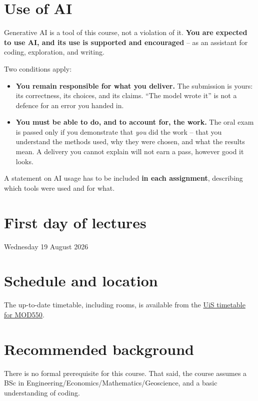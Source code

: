 \documentclass[letterpaper,12pt,oneside]{article}
\begin{document}
\section*{Use of AI}

Generative AI is a tool of this course, not a violation of it. \textbf{You are expected to use AI, and its use is supported and encouraged} -- as an assistant for coding, exploration, and writing.

Two conditions apply:

\begin{itemize}
\item \textbf{You remain responsible for what you deliver.} The submission is yours: its correctness, its choices, and its claims. ``The model wrote it'' is not a defence for an error you handed in.
\item \textbf{You must be able to do, and to account for, the work.} The oral exam is passed only if you demonstrate that \emph{you} did the work -- that you understand the methods used, why they were chosen, and what the results mean. A delivery you cannot explain will not earn a pass, however good it looks.
\end{itemize}

A statement on AI usage has to be included \textbf{in each assignment}, describing which tools were used and for what.

\section*{First day of lectures}

Wednesday 19 August 2026


\section*{Schedule and location}

The up-to-date timetable, including rooms, is available from the \href{https://tp.educloud.no/uis/timeplan/timeplan.php?id=MOD550&type=course&hide_old=1}{UiS timetable for MOD550}.


\section*{Recommended background}

There is no formal prerequisite for this course. That said, the course assumes a BSc in Engineering/Economics/Mathematics/Geoscience, and a basic understanding of coding.
\end{document}
